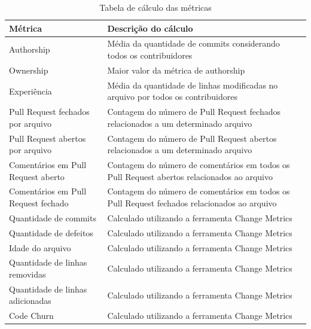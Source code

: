 \begin{table}[H]
\centering
\caption{Tabela de cálculo das métricas}
\label{cálculometricas}
\begin{tabular}{|p{3cm}|p{12cm}|}
\hline
Métrica                             & Descrição do cálculo                                                                        \\ \hline
Authorship                          & Média da quantidade de commits considerando todos os contribuidores                         \\ \hline
Ownership                           & Maior valor da métrica de authorship                                                        \\ \hline
Experiência                         & Média da quantidade de linhas modificadas no arquivo por todos os contribuidores            \\ \hline
Pull Request fechados por arquivo   & Contagem do número de Pull Request fechados relacionados a um determinado arquivo           \\ \hline
Pull Request abertos por arquivo    & Contagem do número de Pull Request abertos relacionados a um determinado arquivo            \\ \hline
Comentários em Pull Request aberto  & Contagem do número de comentários em todos os Pull Request abertos relacionados ao arquivo  \\ \hline
Comentários em Pull Request fechado & Contagem do número de comentários em todos os Pull Request fechados relacionados ao arquivo \\ \hline
Quantidade de commits               & Calculado utilizando a ferramenta Change Metrics                                        \\ \hline
Quantidade de defeitos              & Calculado utilizando a ferramenta Change Metrics                                            \\ \hline
Idade do arquivo                    & Calculado utilizando a ferramenta Change Metrics                                            \\ \hline
Quantidade de linhas removidas      & Calculado utilizando a ferramenta Change Metrics                                            \\ \hline
Quantidade de linhas adicionadas    & Calculado utilizando a ferramenta Change Metrics                                            \\ \hline
Code Churn                          & Calculado utilizando a ferramenta Change Metrics                                            \\ \hline

\end{tabular}
\end{table}
